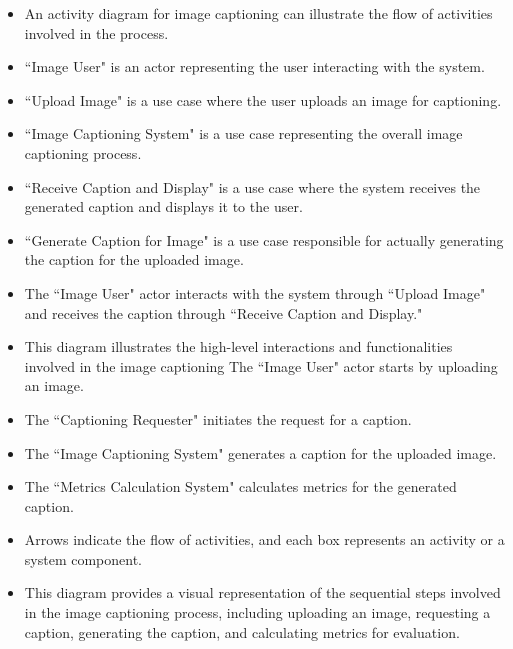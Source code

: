 \documentclass[oneside,a4paper,12pt]{report}
\begin{document}
\begin{itemize}


\item An activity diagram for image captioning can illustrate the flow of activities involved in the process.
\item ``Image User" is an actor representing the user interacting with the system.
\item{``Upload Image" is a use case where the user uploads an image for captioning.}
\item{``Image Captioning System" is a use case representing the overall image captioning process.}
\item{``Receive Caption and Display" is a use case where the system receives the generated caption and displays it to the user.}
\item{``Generate Caption for Image" is a use case responsible for actually generating the caption for the uploaded image.}
\item{The ``Image User" actor interacts with the system through ``Upload Image" and receives the caption through ``Receive Caption and Display."}
\item{This diagram illustrates the high-level interactions and functionalities involved in the image captioning The ``Image User" actor starts by uploading an image.}
\item{The ``Captioning Requester" initiates the request for a caption.}
\item{The ``Image Captioning System" generates a caption for the uploaded image.}
\item{The ``Metrics Calculation System" calculates metrics for the generated caption.}
\item{Arrows indicate the flow of activities, and each box represents an activity or a system component.}
\item{This diagram provides a visual representation of the sequential steps involved in the image captioning process, including uploading an image, requesting a caption, generating the caption, and calculating metrics for evaluation.}
\end{itemize}
\end{document}
